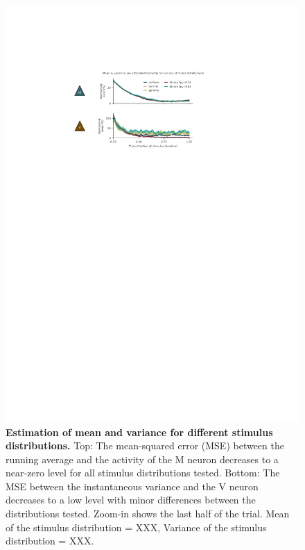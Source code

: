 \documentclass[10pt,a4paper]{article}
\begin{document}
\begin{figure}[!h]
	\centering
    \includegraphics[scale=1]{../results/figures/final/Fig_2_S1}%
\caption{\footnotesize{\bf Estimation of mean and variance for different stimulus distributions.\newline}  
Top: The mean-squared error (MSE) between the running average and the activity of the M neuron decreases to a near-zero level for all stimulus distributions tested. 
Bottom: The MSE between the instantaneous variance and the V neuron decreases to a low level with minor differences between the distributions tested. Zoom-in shows the last half of the trial. Mean of the stimulus distribution = XXX, Variance of the stimulus distribution = XXX.
}
\label{fig:Fig_2_S1}
\end{figure}
\end{document}
